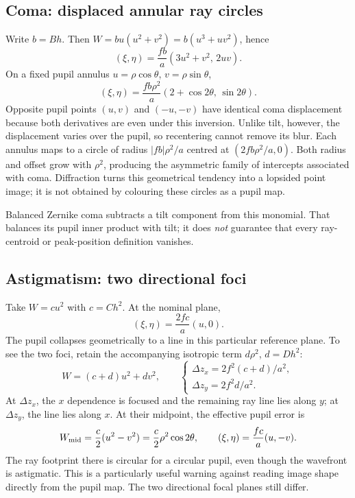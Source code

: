 \subsection{Coma: displaced annular ray circles}
Write $b=Bh$. Then $W=bu(u^2+v^2)=b(u^3+uv^2)$, hence
\begin{equation}
\boxed{(\xi,\eta)=\frac{fb}{a}(3u^2+v^2,\,2uv).}
\end{equation}
On a fixed pupil annulus $u=\rho\cos\theta$, $v=\rho\sin\theta$,
\begin{equation}
(\xi,\eta)=\frac{fb\rho^2}{a}(2+\cos2\theta,\,\sin2\theta).
\end{equation}
Opposite pupil points $(u,v)$ and $(-u,-v)$ have identical coma displacement because both derivatives are even under this inversion. Unlike tilt, however, the displacement varies over the pupil, so recentering cannot remove its blur. Each annulus maps to a circle of radius $|fb|\rho^2/a$ centred at
$(2fb\rho^2/a,0)$. Both radius and offset grow with $\rho^2$, producing the asymmetric family of intercepts associated with coma. Diffraction turns this geometrical tendency into a lopsided point image; it is not obtained by colouring these circles as a pupil map.

Balanced Zernike coma subtracts a tilt component from this monomial. That balances its pupil inner product with tilt; it does \emph{not} guarantee that every ray-centroid or peak-position definition vanishes.

\subsection{Astigmatism: two directional foci}
Take $W=c u^2$ with $c=Ch^2$. At the nominal plane,
\begin{equation}
(\xi,\eta)=\frac{2fc}{a}(u,0).
\end{equation}
The pupil collapses geometrically to a line in this particular reference plane. To see the two foci, retain the accompanying isotropic term $d\rho^2$, $d=Dh^2$:
\begin{equation}
W=(c+d)u^2+dv^2,
\qquad
\begin{cases}
\Delta z_x=2f^2(c+d)/a^2,\\
\Delta z_y=2f^2d/a^2.
\end{cases}
\end{equation}
At $\Delta z_x$, the $x$ dependence is focused and the remaining ray line lies along $y$; at $\Delta z_y$, the line lies along $x$. At their midpoint, the effective pupil error is
\begin{equation}
W_{\rm mid}=\frac c2(u^2-v^2)=\frac c2\rho^2\cos2\theta,
\qquad (\xi,\eta)=\frac{fc}{a}(u,-v).
\end{equation}
The ray footprint there is circular for a circular pupil, even though the wavefront is astigmatic. This is a particularly useful warning against reading image shape directly from the pupil map. The two directional focal planes still differ.

